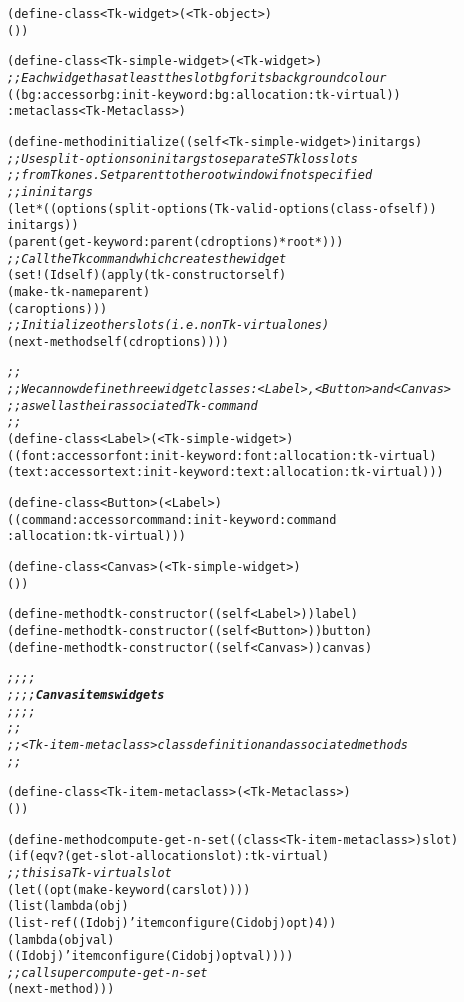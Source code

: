 \begin{alltt}
(define-class {\tt{}<}Tk-widget{\tt{}>} ({\tt{}<}Tk-object{\tt{}>})
  ())



(define-class {\tt{}<}Tk-simple-widget{\tt{}>} ({\tt{}<}Tk-widget{\tt{}>})
  {\it ;; Each widget has at least the slot bg for its background colour}
  ((bg :accessor bg :init-keyword :bg :allocation :tk-virtual))
  :metaclass {\tt{}<}Tk-Metaclass{\tt{}>})


(define-method initialize ((self {\tt{}<}Tk-simple-widget{\tt{}>}) initargs)
  {\it ;; Use split-options on initargs to separate STklos slots }
  {\it ;; from Tk ones. Set parent to the root window if not specified}
  {\it ;; in initargs}
  (let* ((options (split-options (Tk-valid-options (class-of self))
                                 initargs))
         (parent  (get-keyword :parent (cdr options) *root*)))
    {\it ;; Call the Tk command which creates the widget}
    (set! (Id self) (apply (tk-constructor self)
                           (make-tk-name parent) 
                           (car options)))
    {\it ;; Initialize other slots (i.e. non Tk-virtual ones)}
    (next-method self (cdr options))))


{\it ;;}
{\it ;; We can now define three widget classes: {\tt{}<}Label{\tt{}>}, {\tt{}<}Button{\tt{}>} and {\tt{}<}Canvas{\tt{}>}}
{\it ;; as well as their associated Tk-command}
{\it ;;}
(define-class {\tt{}<}Label{\tt{}>} ({\tt{}<}Tk-simple-widget{\tt{}>})
  ((font :accessor font :init-keyword :font :allocation :tk-virtual)
   (text :accessor text :init-keyword :text :allocation :tk-virtual)))

(define-class {\tt{}<}Button{\tt{}>} ({\tt{}<}Label{\tt{}>})
  ((command :accessor command :init-keyword :command 
            :allocation :tk-virtual)))

(define-class {\tt{}<}Canvas{\tt{}>} ({\tt{}<}Tk-simple-widget{\tt{}>})
  ())

(define-method tk-constructor ((self {\tt{}<}Label{\tt{}>}))  label)
(define-method tk-constructor ((self {\tt{}<}Button{\tt{}>})) button)
(define-method tk-constructor ((self {\tt{}<}Canvas{\tt{}>})) canvas)


{\it ;;;;}
{\it ;;;; {\bf Canvas items widgets}}
{\it ;;;;}
{\it ;; }
{\it ;; {\tt{}<}Tk-item-metaclass{\tt{}>} class definition and associated methods  }
{\it ;; }

(define-class {\tt{}<}Tk-item-metaclass{\tt{}>} ({\tt{}<}Tk-Metaclass{\tt{}>})
  ())

(define-method compute-get-n-set ((class {\tt{}<}Tk-item-metaclass{\tt{}>}) slot)
  (if (eqv? (get-slot-allocation slot) :tk-virtual)
      {\it ;; this is a Tk-virtual slot}
      (let ((opt (make-keyword (car slot))))
        (list (lambda (obj)   
                (list-ref ((Id obj) 'itemconfigure (Cid obj) opt) 4))
              (lambda (obj val) 
                ((Id obj) 'itemconfigure (Cid obj) opt val))))
      {\it ;; call super compute-get-n-set}
      (next-method)))


\end{alltt}
